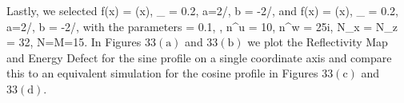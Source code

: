 \vspace{-17mm}
\hspace{-6mm}Lastly, we selected
\be
f(x) = \sin(x),
\quad
\varepsilon_{} = 0.2,
\quad
a=2/\pi, 
\quad 
b = -2/\pi,
\ee
and
\be
f(x) = \cos(x),
\quad
\varepsilon_{} = 0.2,
\quad
a=2/\pi, 
\quad 
b = -2/\pi,
\ee
with the parameters
\be
\alpha = 0.1,
\quad
{},
\quad
n^u = 10,
\quad
n^w = 25i,
\quad
N_x = N_z = 32,
\quad
N=M=15.
\ee
In Figures $33(\text{a})$ and  $33(\text{b})$ we plot the Reflectivity Map and Energy Defect for the sine profile on a single coordinate axis and compare this to an equivalent simulation for the cosine profile in Figures $33(\text{c})$ and  $33(\text{d})$.

\vspace{-21mm}
\begin{figure}[H]
    \centering
    \\

\end{figure}
